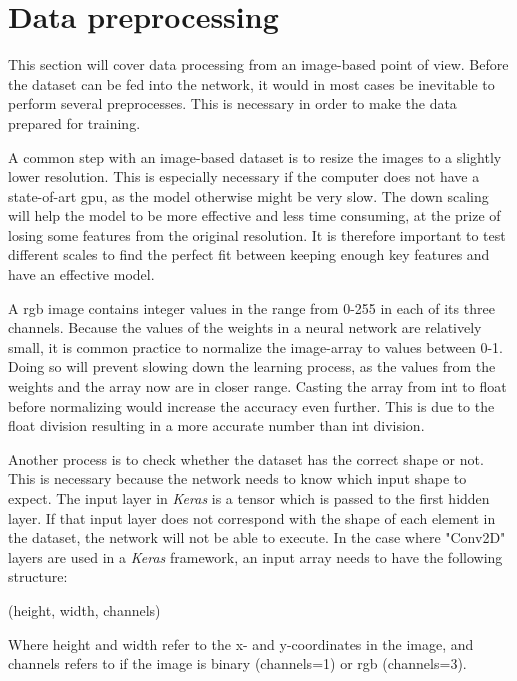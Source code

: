 \documentclass[USenglish]{ifimaster}  %
\begin{document}
\section{Data preprocessing}
This section will cover data processing from an image-based point of view. Before the dataset can be fed into the network, it would in most cases be inevitable to perform several preprocesses. This is necessary in order to make the data prepared for training. 

A common step with an image-based dataset is to resize the images to a slightly lower resolution. This is especially necessary if the computer does not have a state-of-art \ac{gpu}, as the model otherwise might be very slow. The down scaling will help the model to be more effective and less time consuming, at the prize of losing some features from the original resolution. It is therefore important to test different scales to find the perfect fit between keeping enough key features and have an effective model.

A \ac{rgb} image contains integer values in the range from 0-255 in each of its three channels. Because the values of the weights in a neural network are relatively small, it is common practice to normalize the image-array to values between 0-1. Doing so will prevent slowing down the learning process, as the values from the weights and the array now are in closer range. Casting the array from int to float before normalizing would increase the accuracy even further. This is due to the float division resulting in a more accurate number than int division.

Another process is to check whether the dataset has the correct shape or not. This is necessary because the network needs to know which input shape to expect. The input layer in \textit{Keras} is a tensor which is passed to the first hidden layer. If that input layer does not correspond with the shape of each element in the dataset, the network will not be able to execute. In the case where "Conv2D" layers are used in a \textit{Keras} framework, an input array needs to have the following structure:
\newline
\newline
\begin{center}
    (height, width, channels)
\end{center}
Where height and width refer to the x- and y-coordinates in the image, and channels refers to if the image is binary (channels=1) or \ac{rgb} (channels=3).
\end{document}
